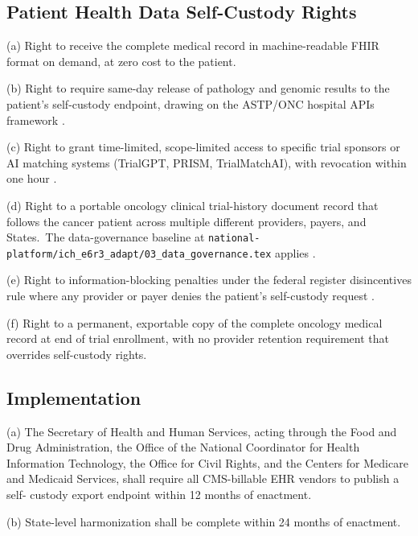 \subsection{Patient Health Data Self-Custody Rights}

\hspace{0.5cm} (a) Right to receive the complete medical record in machine-readable FHIR format on demand, at zero cost to the patient.

(b) Right to require same-day release of pathology and genomic
results to the patient's self-custody endpoint, drawing on the
ASTP/ONC hospital APIs framework
\cite{astp_onc_hospital_apis_2024}.

(c) Right to grant time-limited, scope-limited access to specific
trial sponsors or AI matching systems (TrialGPT, PRISM,
TrialMatchAI), with revocation within one hour
\cite{jin2024trialgpt, gupta2024prism, abdallah2026trialmatchai}.

(d) Right to a portable oncology clinical trial-history document record that follows the cancer
patient across multiple different providers, payers, and States.\ The data-governance
baseline at
\texttt{national-platform/ich\_e6r3\_adapt/03\_data\_governance.tex}
applies \cite{kawchak_2026_18973368}.

(e) Right to information-blocking penalties under the federal
register disincentives rule where any provider or payer denies the
patient's self-custody request
\cite{federal_register_info_blocking_disincentives_2024}.

(f) Right to a permanent, exportable copy of the complete oncology
medical record at end of trial enrollment, with no provider
retention requirement that overrides self-custody
rights.

\subsection{Implementation}

\hspace{0.5cm} (a) The Secretary of Health and Human Services, acting through the
Food and Drug Administration, the Office of the National
Coordinator for Health Information Technology, the Office for
Civil Rights, and the Centers for Medicare and Medicaid Services,
shall require all CMS-billable EHR vendors to publish a self-
custody export endpoint within 12 months of enactment.

(b) State-level harmonization shall be complete within 24 months
of enactment.

